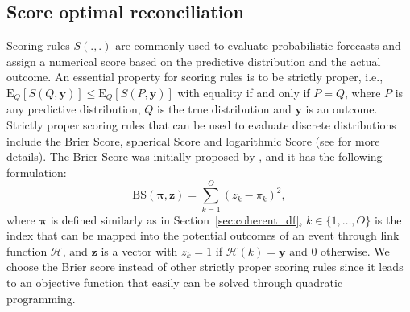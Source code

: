 \documentclass[a4paper,review,12pt,authoryear]{elsarticle}
\newcommand{\bpi}{\bm{\pi}}
\theoremstyle{definition}
\begin{document}
    \subsection{Score optimal reconciliation}
    \label{sec:algorithm}

    Scoring rules $S(.,.)$ are commonly used to evaluate probabilistic forecasts and assign a numerical score based on the predictive distribution and the actual outcome.
    An essential property for scoring rules is to be strictly proper, i.e., $\text{E}_Q[S(Q, \mathbf{y})] \leq \text{E}_Q[S(P, \mathbf{y})]$ with equality if and only if $P=Q$, where $P$ is any predictive distribution, $Q$ is the true distribution and $\mathbf{y}$ is an outcome.
    Strictly proper scoring rules that can be used to evaluate discrete distributions include the Brier Score, spherical Score and logarithmic Score (see \citealp{gneitingStrictlyProperScoring2007} for more details).
    The Brier Score was initially proposed by \cite{brier1950verification}, and it has the following formulation:
    \[
      \text{BS}(\bpi, \mathbf{z}) = \sum_{k=1}^{O}(z_k - \pi_k)^2,
    \] where $\bpi$ is defined similarly as in Section~\ref{sec:coherent_df},
    $k\in \{1,\dots,O\}$ is the index that can be mapped into the potential outcomes of an event through link function $\mathcal{H}$, and $\mathbf{z}$ is a vector with $z_k = 1$ if $\mathcal{H}(k) = \mathbf{y}$ and $0$ otherwise.
    We choose the Brier score instead of other strictly proper scoring rules since it leads to an objective function that easily can be solved through quadratic programming.
\end{document}
